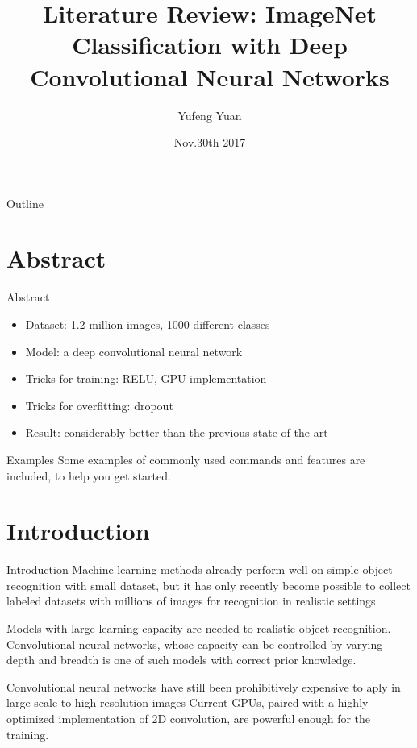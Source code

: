 \documentclass{beamer}
\title[Your Short Title]{Literature Review:
    ImageNet Classification with Deep Convolutional Neural Networks}
\author{Yufeng Yuan}
\institute{CS281K Computational Photography}
\date{Nov.30th 2017}
\begin{document}
    
    \begin{frame}
        \titlepage
    \end{frame}
    
    \begin{frame}{Outline}
      \tableofcontents
    \end{frame}
    
    \section{Abstract}
    
    \begin{frame}{Abstract}
    
    \begin{itemize}
        \item Dataset: 1.2 million images, 1000 different classes 
        \item Model: a deep convolutional neural network
        \item Tricks for training: RELU, GPU implementation
        \item Tricks for overfitting: dropout
        \item Result: considerably better than the previous state-of-the-art
    \end{itemize}
    
    \vskip 1cm
    
    \begin{block}{Examples}
    Some examples of commonly used commands and features are included, to help you get started.
    \end{block}

    \end{frame}


    \section{Introduction}
    \begin{frame}{Introduction}
        Machine learning methods already perform well on simple object recognition with small dataset,
        but it has only recently become possible to collect labeled datasets with millions of images for 
        recognition in realistic settings.

        Models with large learning capacity are needed to realistic object recognition. Convolutional neural networks, 
        whose capacity can be controlled by varying  depth and breadth is one of such models with correct prior knowledge.

        Convolutional neural networks have still been prohibitively expensive to aply in large scale to high-resolution images
        Current GPUs, paired with a highly-optimized implementation of 2D convolution, are powerful enough for the training.

    \end{frame}
\end{document}
